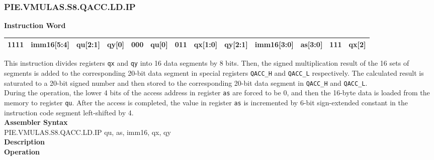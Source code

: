 \subsubsection{PIE.VMULAS.S8.QACC.LD.IP}\label{instruction:PIEVMULASS8QACCLDIP}
\setlength\tabcolsep{6pt}
\textbf{Instruction Word} \\
\begin{tabular}{|c|c|c|c|c|c|c|c|c|c|c|c|c|}
	\hline
	1111 & imm16[5:4] & qu[2:1] & qy[0] & 000 & qu[0] & 011 & qx[1:0] & qy[2:1] & imm16[3:0] & as[3:0] & 111 & qx[2] \\
	\hline
\end{tabular}
This instruction divides registers \lstinline{qx} and \lstinline{qy} into 16 data segments by 8 bits. Then, the signed multiplication result of the 16 sets of segments is added to the corresponding 20-bit data segment in special registers \lstinline{QACC_H} and \lstinline{QACC_L} respectively. The calculated result is saturated to a 20-bit signed number and then stored to the corresponding 20-bit data segment in \lstinline{QACC_H} and \lstinline{QACC_L}.\\
During the operation, the lower 4 bits of the access address in register \lstinline{as} are forced to be 0, and then the 16-byte data is loaded from the memory to register \lstinline{qu}. After the access is completed, the value in register \lstinline{as} is incremented by 6-bit sign-extended constant in the instruction code segment left-shifted by 4.\\
\textbf{Assembler Syntax} \\
PIE.VMULAS.S8.QACC.LD.IP qu, as, imm16, qx, qy \\
\textbf{Description} \\
\textbf{Operation}
